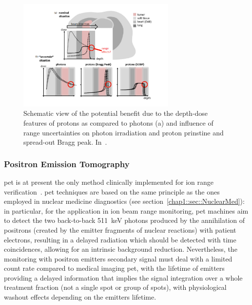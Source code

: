 \begin{figure}[!htbp]
\centering
\includegraphics[width=0.7\textwidth]{03_GraphicFiles/chapter1_Introduction/rangeUnc.pdf}
\caption{Schematic view of the potential benefit due to the depth-dose features of protons as compared to photons (a) and influence of range uncertainties on photon irradiation and proton prinstine and spread-out Bragg peak. In~\cite{Knopf2013}.}
\label{chap1::fig::rangeUnc}
\end{figure} 





  
      


\subsubsection{Positron Emission Tomography}\label{chap1::subsec::RangePET}
\gls{pet} is at present the only method clinically implemented for ion range verification~\parencite{Hishikawa2002, Enghardt2004, Parodi2007, Bauer2013}. \gls{pet} techniques are based on the same principle as the ones employed in nuclear medicine diagnostics (see section~\ref{chap1::sec::NuclearMed}): in particular, for the application in ion beam range monitoring, \gls{pet} machines aim to detect the two back-to-back 511~keV photons produced by the annihilation of positrons (created by the emitter fragments of nuclear reactions) with patient electrons, resulting in a delayed radiation which should be detected with time coincidences, allowing for an intrinsic background reduction. Nevertheless, the monitoring with positron emitters secondary signal must deal with a limited count rate compared to medical imaging \gls{pet}, with the lifetime of emitters providing a delayed information that implies the signal integration over a whole treatment fraction (not a single spot or group of spots), with physiological washout effects depending on the emitters lifetime.

